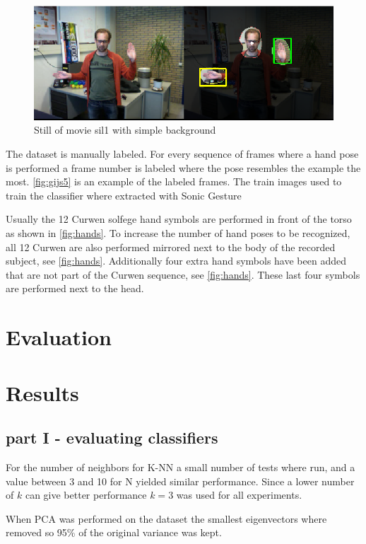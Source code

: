 \begin{figure}[htbp]
\center{}
\includegraphics[width=0.8\linewidth]{figures/complex.png}
\caption{Still of movie sil1 with simple background}
\label{fig:complexbackground}
\end{figure}


The dataset is manually labeled. For every sequence of frames where a hand pose is performed a frame number is labeled where the pose resembles the example the most. \autoref{fig:gijs5} is an example of the labeled frames. The train images used to train the classifier where extracted with Sonic Gesture

Usually the 12 Curwen solfege hand symbols are performed in front of the torso as shown in \autoref{fig:hands}. To increase the number of hand poses to be recognized, all 12 Curwen are also performed mirrored next to the body of the recorded subject, see \autoref{fig:hands}. Additionally four extra hand symbols have been added that are not part of the Curwen sequence, see \autoref{fig:hands}. These last four symbols are performed next to the head.

\section{Evaluation}


\section{Results}

\subsection{part I - evaluating classifiers}
For the number of neighbors for K-NN a small number of tests where run, and a value between 3 and 10 for N yielded similar performance. Since a lower number of $k$ can give better performance $k=3$ was used for all experiments.

When PCA was performed on the dataset the smallest eigenvectors where removed so 95\% of the original variance was kept.

